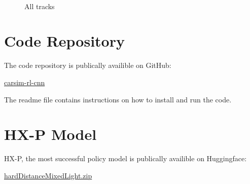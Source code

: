 \begin{figure}[h]
    \qquad
    \qquad
    \qquad
    \\
    \caption{All tracks}
    \label{fig:all_tracks}
\end{figure}

\section{Code Repository}

The code repository is publically availible on GitHub:

\href{https://github.com/geschnee/carsim-rl-cnn}{carsim-rl-cnn}

The readme file contains instructions on how to install and run the code.

\section{\ac{HX-P} Model}

\ac{HX-P}, the most successful policy model is publically availible on Huggingface:

\href{https://huggingface.co/geschnee/carsim-rl-cnn/blob/main/models/hardDistanceMixedLight.zip}{hardDistanceMixedLight.zip}


